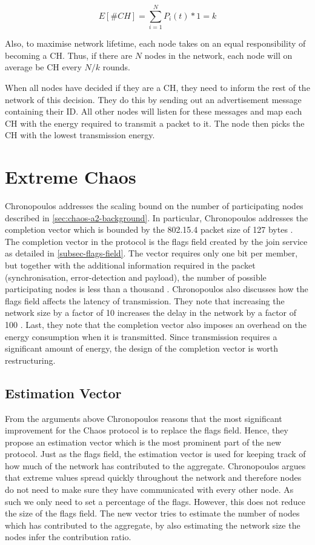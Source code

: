 $$E[\#CH] = \sum_{i=1}^N P_i(t) * 1 = k$$

Also, to maximise network lifetime, each node takes on an equal responsibility of becoming a CH. Thus, if there are $N$ nodes in the network, each node will on average be CH every $N/k$ rounds.

When all nodes have decided if they are a CH, they need to inform the rest of the network of this decision. They do this by sending out an advertisement message containing their ID. All other nodes will listen for these messages and map each CH with the energy required to transmit a packet to it. The node then picks the CH with the lowest transmission energy.

\section{Extreme Chaos}
Chronopoulos \cite{Chronopoulos2016-extreme-chaos} addresses the scaling bound on the number of participating nodes described in \cref{sec:chaos-a2-background}. In particular, Chronopoulos addresses the completion vector which is bounded by the 802.15.4 packet size of 127 bytes \cite{IEEE-802-15-4}. The completion vector in the \atwo{} protocol is the flags field created by the join service as detailed in \cref{subsec-flags-field}. The vector requires only one bit per member, but together with the additional information required in the packet (synchronisation, error-detection and payload), the number of possible participating nodes is less than a thousand \cite{chaos-introduction-paper}. Chronopoulos also discusses how the flags field affects the latency of transmission. They note that increasing the network size by a factor of 10 increases the delay in the network by a factor of 100 \cite{Chronopoulos2016-extreme-chaos}. Last, they note that the completion vector also imposes an overhead on the energy consumption when it is transmitted. Since transmission requires a significant amount of energy, the design of the completion vector is worth restructuring.

\subsection{Estimation Vector}
From the arguments above Chronopoulos reasons that the most significant improvement for the Chaos protocol is to replace the flags field. Hence, they propose an estimation vector which is the most prominent part of the new protocol. Just as the flags field, the estimation vector is used for keeping track of how much of the network has contributed to the aggregate. Chronopoulos argues that extreme values spread quickly throughout the network and therefore nodes do not need to make sure they have communicated with every other node. As such we only need to set a percentage of the flags. However, this does not reduce the size of the flags field. The new vector tries to estimate the number of nodes which has contributed to the aggregate, by also estimating the network size the nodes infer the contribution ratio. 



